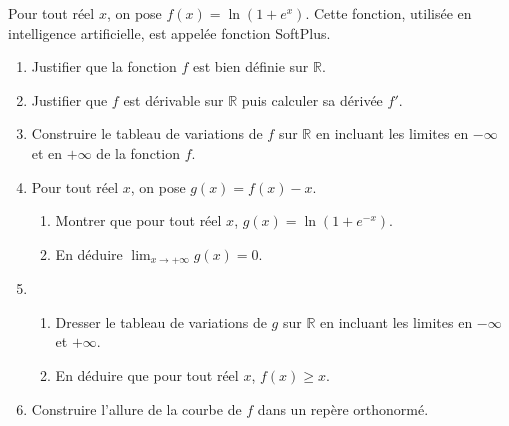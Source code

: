 \documentclass[11pt,fleqn, openany]{book} %
\begin{document}
\begin{exercise}Pour tout réel $x$, on pose $f(x)=\ln(1+e^x)$. Cette fonction, utilisée en intelligence artificielle, est appelée fonction SoftPlus.
\begin{enumerate}
\item Justifier que la fonction $f$ est bien définie sur $\mathbb{R}$.
\item Justifier que $f$ est dérivable sur $\mathbb{R}$ puis calculer sa dérivée $f'$.
\item Construire le tableau de variations de $f$ sur $\mathbb{R}$ en incluant les limites en $-\infty$ et en $+\infty$ de la fonction $f$.
\item Pour tout réel $x$, on pose $g(x)=f(x)-x$.
\begin{enumerate}
\item Montrer que pour tout réel $x$, $g(x)=\ln(1+e^{-x})$.
\item En déduire $\displaystyle\lim_{x\to +\infty}g(x)=0$. 
\end{enumerate}
\item \begin{enumerate}
\item Dresser le tableau de variations de $g$ sur $\mathbb{R}$ en incluant les limites en $-\infty$ et $+\infty$.
\item En déduire que pour tout réel $x$, $f(x)\geqslant x$.
\end{enumerate}

\item Construire l'allure de la courbe de $f$ dans un repère orthonormé.
\end{enumerate}\end{exercise}
\end{document}
